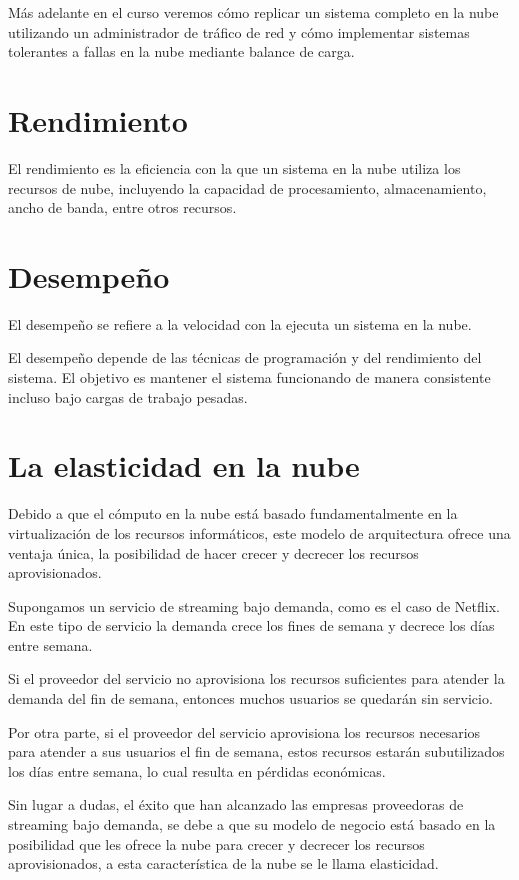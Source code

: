 Más adelante en el curso veremos cómo replicar un sistema completo en la nube utilizando un administrador de tráfico de red y cómo implementar sistemas tolerantes a fallas en la nube mediante balance de carga.

\section{Rendimiento}

El rendimiento es la eficiencia con la que un sistema en la nube utiliza los recursos de nube, incluyendo la capacidad de procesamiento, almacenamiento, ancho de banda, entre otros recursos.

\section{Desempeño}

El desempeño se refiere a la velocidad con la ejecuta un sistema en la nube.

El desempeño depende de las técnicas de programación y del rendimiento del sistema. El objetivo es mantener el sistema funcionando de manera consistente incluso bajo cargas de trabajo pesadas.

\section{La elasticidad en la nube}

Debido a que el cómputo en la nube está basado fundamentalmente en la virtualización de los recursos informáticos, este modelo de arquitectura ofrece una ventaja única, la posibilidad de hacer crecer y decrecer los recursos aprovisionados.

Supongamos un servicio de streaming bajo demanda, como es el caso de Netflix. En este tipo de servicio la demanda crece los fines de semana y decrece los días entre semana.

Si el proveedor del servicio no aprovisiona los recursos suficientes para atender la demanda del fin de semana, entonces muchos usuarios se quedarán sin servicio.

Por otra parte, si el proveedor del servicio aprovisiona los recursos necesarios para atender a sus usuarios el fin de semana, estos recursos estarán subutilizados los días entre semana, lo cual resulta en pérdidas económicas.

Sin lugar a dudas, el éxito que han alcanzado las empresas proveedoras de streaming bajo demanda, se debe a que su modelo de negocio está basado en la posibilidad que les ofrece la nube para crecer y decrecer los recursos aprovisionados, a esta característica de la nube se le llama elasticidad.

